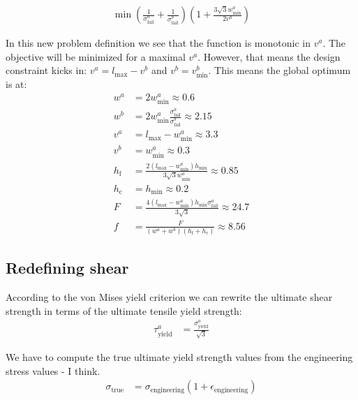 \begin{align*}
	\min{  \left(\frac{1}{\sigma^a_\text{fail}} + \frac{1}{\sigma^b_\text{fail}} \right) \left(1 + \frac{3\sqrt{3} w^a_\text{min} }{  2 v^a } \right)  }
\end{align*}

In this new problem definition we see that the function is monotonic in $v^a$.
The objective will be minimized for a maximal $v^a$.
However, that means the design constraint kicks in: $v^a = l_\text{max} - v^b$ and $v^b = v^b_\text{min}$.
This means the global optimum is at:
\begin{align*}
	w^a &= 2 w^a_\text{min} \approx 0.6 \\
	w^b &= 2 w^a_\text{min} \frac{ \sigma^a_\text{fail}}{ \sigma^b_\text{fail}} \approx 2.15\\
	v^a &= l_\text{max} - w^a_\text{min} \approx 3.3 \\
	v^b &= w^a_\text{min} \approx 0.3 \\
	h_\text{f} &= \frac{2 \left(l_\text{max} - w^a_\text{min}\right) h_\text{min} }{3\sqrt{3} w^a_\text{min}} \approx 0.85 \\
	h_\text{c} &= h_\text{min} \approx 0.2 \\
	F &= \frac{4 \left(l_\text{max} - w^a_\text{min}\right) h_\text{min} \sigma^a_\text{fail}}{3\sqrt{3}} \approx 24.7 \\
	f &= \frac{F}{\left( w^a + w^b \right) \left( h_\text{f} + h_\text{c} \right) } \approx 8.56
\end{align*}


\subsection{Redefining shear}

According to the von Mises yield criterion we can rewrite the ultimate shear strength in terms of the ultimate tensile yield strength:
\begin{align*}
	\tau^a_\text{yield} &= \frac{ \sigma^a_\text{yield} }{\sqrt{3}} 
\end{align*}

We have to compute the true ultimate yield strength values from the engineering stress values - I think.
\begin{align*}
	\sigma_\text{true} %
	&= \sigma_\text{engineering} (1 + \epsilon_\text{engineering})
\end{align*}
